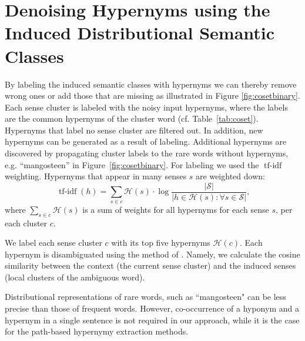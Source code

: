 \documentclass[10pt, a4paper]{article}
\DeclareMathOperator{\tfidf}{tf-idf}
\begin{document}
\section{Denoising Hypernyms using the Induced Distributional Semantic Classes}
\label{sec:labeling}

By labeling the induced semantic classes with hypernyms we can thereby remove wrong ones or add those that are missing as illustrated in Figure \ref{fig:cosetbinary}. Each sense cluster is labeled with the noisy input hypernyms, where the labels are the common hypernyms of the cluster word (cf. Table~\ref{tab:coset}). Hypernyms that label no sense cluster are filtered out. In addition, new hypernyms can be generated as a result of labeling. Additional hypernyms are discovered by propagating cluster labels to the rare words without hypernyms, e.g. ``mangosteen'' in Figure~\ref{fig:cosetbinary}. For labeling we used the $\tfidf$ weighting. Hypernyms that appear in many senses $s$ are weighted down: 
%
\begin{equation}
\tfidf(h) = \sum_{s \in c} \mathcal{H}(s) \cdot \log \frac{\left\vert\mathcal{S}\right\vert}{\left\vert{}h \in \mathcal{H}(s) : \forall s \in \mathcal{S}\right\vert}\text{,}
\end{equation}
%
where $\sum_{s \in c} \mathcal{H}(s)$ is a sum of weights for all hypernyms for each sense $s$, per each cluster $c$.

We label each sense cluster  $c$ with its top five hypernyms $\mathcal{H}(c)$. Each hypernym is disambiguated using the method of . Namely, we calculate the cosine similarity between the context (the current sense cluster) and the induced senses (local clusters of the ambiguous word).

Distributional representations of rare words, such as ``mangosteen" can be less precise than those of frequent words. However, co-occurrence of a hyponym and a hypernym in a single sentence is not required in our approach, while it is the case for the path-based  hypernymy extraction methods.
\end{document}
